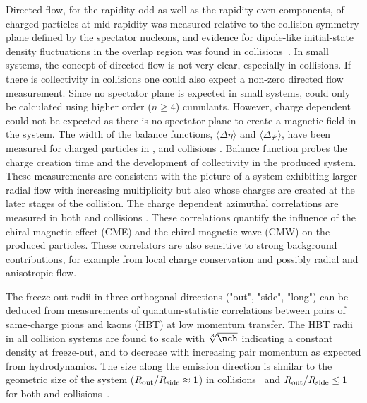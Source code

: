 \documentclass[../report.tex]{subfiles}
\begin{document}
Directed flow, for the rapidity-odd as well as the rapidity-even components, of charged particles at mid-rapidity was measured relative to the collision symmetry plane defined by the spectator nucleons, and evidence for dipole-like initial-state density fluctuations in the overlap region was found in \PbPb collisions~\cite{Abelev:2013cva}. In small systems, the concept of directed flow is not very clear, especially in \pp collisions. If there is collectivity in \pp collisions one could also expect a non-zero directed flow measurement. Since no spectator plane is expected in small systems, \vone could only be calculated using higher order ($n\geq 4$) cumulants. However, charge dependent \vone could not be expected as there is no spectator plane to create a magnetic field in the system. The width of the balance functions, $\langle\Delta\eta\rangle$ and $\langle\Delta\varphi\rangle$, have been measured for charged particles in \pp, \pPb and \PbPb collisions \cite{Abelev:2013csa,Adam:2015gda}. Balance function probes the charge creation time and the development of collectivity in the produced system. These measurements are consistent with the picture of a system exhibiting larger radial flow with increasing multiplicity but also whose charges are created at the later stages of the collision. The charge dependent azimuthal correlations are measured in both \PbPb and \pPb collisions \cite{Abelev:2014pja,Adam:2015pya,Aamodt:2011kd,CMS:2014mla,Aaboud:2017xpw}. These correlations quantify the influence of the chiral magnetic effect (CME) and the chiral magnetic wave (CMW) on the produced particles. These correlators are also sensitive to strong background contributions, for example from local charge conservation and possibly radial and anisotropic flow. %

The freeze-out radii in three orthogonal directions ("out", "side", "long") can be deduced from measurements of quantum-statistic correlations between pairs of same-charge pions and kaons (HBT) at low momentum transfer. The HBT radii in all collision systems are found to scale with $\sqrt[3]{\nch}$ indicating a constant density at freeze-out, and to decrease with increasing pair momentum \kT as expected from hydrodynamics. The size along the emission direction is similar to the geometric size of the system ($R_{\rm out}/R_{\rm side} \approx 1$) in \PbPb collisions~\cite{Adam:2015vna,Adam:2015vja,Abelev:2014pja,CMS:2014mla,Acharya:2017qtq,Acharya:2017qtq} and $R_{\rm out}/R_{\rm side} \leq 1$ for both \pPb and \pp collisions~\cite{Abelev:2014pja,Adam:2015pya,Aamodt:2011kd,CMS:2014mla,Aaboud:2017xpw}.
\end{document}
